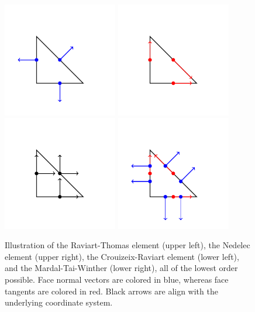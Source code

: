 \begin{figure}
\begin{center}
\includegraphics[width=5cm]{chapters/element/rt.pdf}
\includegraphics[width=5cm]{chapters/element/nedlec.pdf}
\includegraphics[width=5cm]{chapters/element/cr.pdf}
\includegraphics[width=5cm]{chapters/element/mtw.pdf}
	\caption{Illustration of the Raviart-Thomas element (upper left), the  Nedelec element (upper right), the Crouizeix-Raviart element (lower left), and the Mardal-Tai-Winther (lower right), all of the lowest order possible. 
Face normal vectors are colored in blue, whereas face tangents are colored in red. Black arrows are  
align with the underlying coordinate system. 
} \label{fig:rtetc}
\end{center}

\end{figure}







